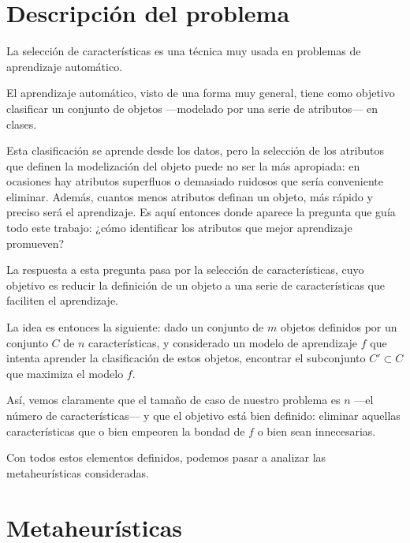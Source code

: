 \documentclass[a4paper, 11pt, titlepage]{article}
\begin{document}
    \maketitle

    \tableofcontents
    \newpage


    \section{Descripción del problema}
    La selección de características es una técnica muy usada en problemas de aprendizaje automático.

    El aprendizaje automático, visto de una forma muy general, tiene como objetivo clasificar un conjunto de objetos ---modelado por una serie de atributos--- en clases.

    Esta clasificación se aprende desde los datos, pero la selección de los atributos que definen la modelización del objeto puede no ser la más apropiada: en ocasiones hay atributos superfluos o demasiado ruidosos que sería conveniente eliminar. Además, cuantos menos atributos definan un objeto, más rápido y preciso será el aprendizaje. Es aquí entonces donde aparece la pregunta que guía todo este trabajo: ¿cómo identificar los atributos que mejor aprendizaje promueven?

    La respuesta a esta pregunta pasa por la selección de características, cuyo objetivo es reducir la definición de un objeto a una serie de características que faciliten el aprendizaje.

    La idea es entonces la siguiente: dado un conjunto de $m$ objetos definidos por un conjunto $C$ de $n$ características, y considerado un modelo de aprendizaje $f$ que intenta aprender la clasificación de estos objetos, encontrar el subconjunto $C' \subset C$ que maximiza el modelo $f$.

    Así, vemos claramente que el tamaño de caso de nuestro problema es $n$ ---el número de características--- y que el objetivo está bien definido: eliminar aquellas características que o bien empeoren la bondad de $f$ o bien sean innecesarias.

    Con todos estos elementos definidos, podemos pasar a analizar las metaheurísticas consideradas.

    \section{Metaheurísticas}
\end{document}
